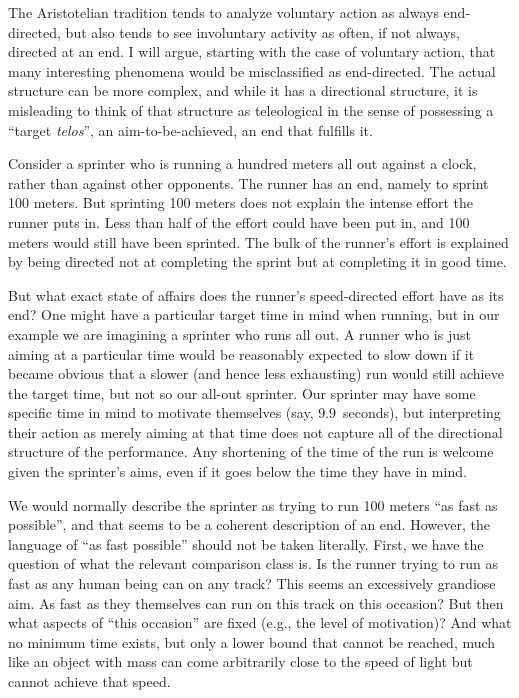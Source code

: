 The Aristotelian tradition tends to analyze voluntary action as always end-directed, but also tends to see involuntary activity as 
often, if not always, directed at an end. I will argue, starting with the case of voluntary action, that many interesting phenomena 
would be misclassified as end-directed. The actual structure can be more complex, and while it has a directional structure, it is
misleading to think of that structure as teleological in the sense of possessing a ``target \textit{telos}'', an aim-to-be-achieved,
an end that fulfills it.

Consider a sprinter who is running a hundred meters all out against a clock, rather than against other opponents. The runner has an end, 
namely to sprint 100 meters. But sprinting 100 meters does not explain the intense effort the runner puts in. Less than half of the effort 
could have been put in, and 100 meters would still have been sprinted. The bulk of the runner's effort is explained by being directed 
not at completing the sprint but at completing it in good time.

But what exact state of affairs does the runner's speed-directed effort have as its end? One might have a particular target time in mind when running, but in our example we are imagining a sprinter who runs all out. A runner who is just aiming at a particular time would be reasonably expected to slow down if it became obvious
that a slower (and hence less exhausting) run would still achieve the target time, but not so our all-out sprinter. Our sprinter may have some specific time in mind
to motivate themselves (say, 9.9~seconds), but interpreting their action as merely aiming at that time does not capture all of the directional structure 
of the performance. Any shortening of the time of the run is welcome given the sprinter's aims, even if it goes
below the time they have in mind.

We would normally describe the sprinter as trying to run 100 meters ``as fast as possible'', and that seems to be a coherent description
of an end. However, the language of ``as fast possible'' should not be taken literally. First, we have the question of what the relevant
comparison class is. Is the runner trying to run as fast as any human being can on any track? This seems an excessively
grandiose aim. As fast as they themselves can run on this track on this occasion? But then what aspects of ``this occasion'' are 
fixed (e.g., the level of motivation)? And what no minimum time exists, but only a lower bound that cannot be reached, much like
an object with mass can come arbitrarily close to the speed of light but cannot achieve that speed.

